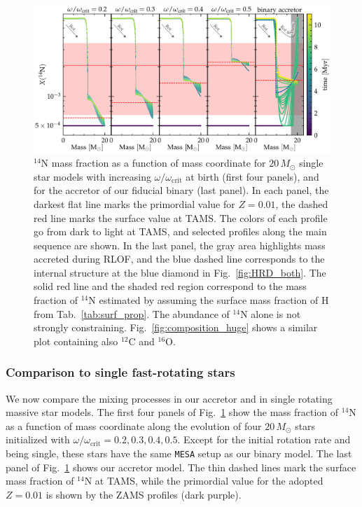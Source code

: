 \documentclass[twocolumn,twocolappendix,trackchanges]{aastex63}
\DeclareRobustCommand{\Figref}[1]{Fig.~\ref{#1}}
\DeclareRobustCommand{\Tabref}[1]{Tab.~\ref{#1}}
\begin{document}
\begin{figure}[htbp]
  \centering
  \includegraphics[width=\textwidth]{n14_struct_complete_zeta_ab}
  \caption{$^{14}\mathrm{N}$ mass fraction as a function of mass
    coordinate for $20\,M_\odot$ single star models with increasing
    $\omega/\omega_\mathrm{crit}$ at birth (first four panels), and
    for the accretor of our fiducial binary (last panel). In each
    panel, the darkest flat line marks the primordial value for
    $Z=0.01$, the dashed red line marks the surface value at TAMS. The
    colors of each profile go from dark to light at TAMS, and selected
    profiles along the main sequence are shown.  In
    the last panel, the gray area highlights mass accreted during
    RLOF, and the blue dashed line corresponds to the internal
    structure at the blue
    diamond in \Figref{fig:HRD_both}. The solid red line and
    the shaded red region correspond to the mass fraction of
    $^{14}\mathrm{N}$ estimated by  assuming
    the surface mass fraction of H from \Tabref{tab:surf_prop}. The
    abundance of $^{14}\mathrm{N}$ alone is not strongly
    constraining. \Figref{fig:composition_huge} shows a similar plot
    containing also $^{12}\mathrm{C}$ and $^{16}\mathrm{O}$.}
  \label{fig:n14}
\end{figure}

\subsubsection{Comparison to single fast-rotating stars}
\label{sec:mix_comparison_single}

We now compare the mixing processes
in our accretor and in single rotating massive star models. The first
four panels of \Figref{fig:n14} show the mass fraction of $^{14}\mathrm{N}$
as a function of mass coordinate along the evolution of four
$20\,M_\odot$ stars initialized with
$\omega/\omega_\mathrm{crit}=0.2,0.3,0.4,0.5$. Except for the initial rotation rate and
being single, these stars have the same \texttt{MESA}
setup as our binary model. The last panel of \Figref{fig:n14} shows
our accretor model. The thin
dashed lines mark the surface mass
fraction of $^{14}\mathrm{N}$ at TAMS, while the primordial value for
the adopted $Z=0.01$ is shown by the ZAMS profiles (dark purple).
\end{document}
